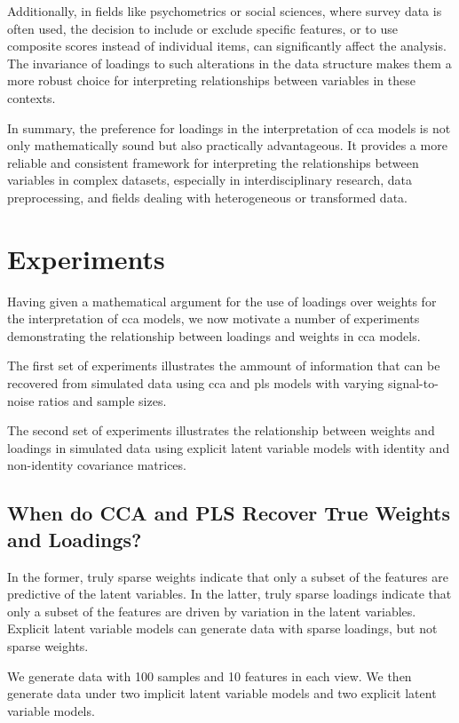 Additionally, in fields like psychometrics or social sciences, where survey data is often used, the decision to include or exclude specific features, or to use composite scores instead of individual items, can significantly affect the analysis. The invariance of \gls{loadings} to such alterations in the data structure makes them a more robust choice for interpreting relationships between variables in these contexts.

In summary, the preference for \gls{loadings} in the interpretation of \acrshort{cca} models is not only mathematically sound but also practically advantageous. It provides a more reliable and consistent framework for interpreting the relationships between variables in complex datasets, especially in interdisciplinary research, data preprocessing, and fields dealing with heterogeneous or transformed data.

\section{Experiments}

Having given a mathematical argument for the use of \gls{loadings} over weights for the interpretation of \acrshort{cca} models, we now motivate a number of experiments demonstrating the relationship between loadings and weights in \acrshort{cca} models.

The first set of experiments illustrates the ammount of information that can be recovered from simulated data using \acrshort{cca} and \acrshort{pls} models with varying signal-to-noise ratios and sample sizes.

The second set of experiments illustrates the relationship between weights and \gls{loadings} in simulated data using explicit latent variable models with identity and non-identity covariance matrices.

\subsection{When do CCA and PLS Recover True Weights and Loadings?}

In the former, truly sparse weights indicate that only a subset of the features are predictive of the latent variables.
In the latter, truly sparse \gls{loadings} indicate that only a subset of the features are driven by variation in the latent variables.
Explicit latent variable models can generate data with sparse \gls{loadings}, but not sparse weights.

We generate data with 100 samples and 10 features in each view.
We then generate data under two implicit latent variable models and two explicit latent variable models.

